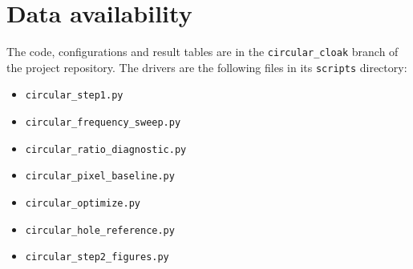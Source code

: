 \documentclass[preprint,12pt]{elsarticle}
\begin{document}
\section*{Data availability}
The code, configurations and result tables are in the \texttt{circular\_cloak} branch of the project repository. The drivers are the following files in its \texttt{scripts} directory:
\begin{itemize}
\item \texttt{circular\_step1.py}
\item \texttt{circular\_frequency\_sweep.py}
\item \texttt{circular\_ratio\_diagnostic.py}
\item \texttt{circular\_pixel\_baseline.py}
\item \texttt{circular\_optimize.py}
\item \texttt{circular\_hole\_reference.py}
\item \texttt{circular\_step2\_figures.py}
\end{itemize}




\end{document}
